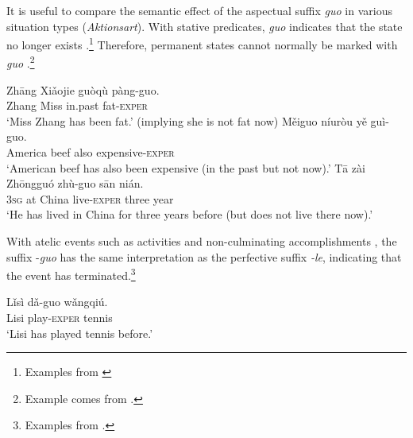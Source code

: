 It is useful to compare the semantic effect of the aspectual suffix \textit{guo} in various situation types (\textit{Aktionsart}). With stative predicates, \textit{guo} indicates that the state no longer exists .\footnote{Examples from \citet[20, 23]{Ma1977}} Therefore, permanent states cannot normally be marked with \textit{guo} .\footnote{Example  comes from \citet[149]{XiaoMcEnery2004}.}


\ea \label{ex:22.43}
\ea \gll  Zhāng  Xiǎojie  guòqù  pàng-guo.\\
Zhang  Miss  in.past  fat-\textsc{exper}\\
\glt ‘Miss Zhang has been fat.’ (implying she is not fat now) 
\ex \gll Měiguo  níuròu  yě  guì-guo.\\
America  beef  also  expensive-\textsc{exper}\\
\glt ‘American beef has also been expensive (in the past but not now).’ 
\ex \gll  Tā  zài  Zhōngguó  zhù-guo  sān  nián.\\
\textsc{3sg}  at  China  live-\textsc{exper} three  year\\
\glt ‘He has lived in China for three years before (but does not live there now).’ 
\z {}
\z


With atelic events such as activities  and non-culminating accomplishments , the suffix -\textit{guo} has the same interpretation as the perfective suffix \textit{-le}, indicating that the event has terminated.\footnote{Examples from \citet[267]{Smith1997}.}


\ea \label{ex:22.45}
\gll Lǐsì dǎ-guo  wǎngqiú.\\
Lisi  play-\textsc{exper}  tennis\\
\glt ‘Lisi has played tennis before.’ 
\ex \label{ex:22.46}
\z \z


